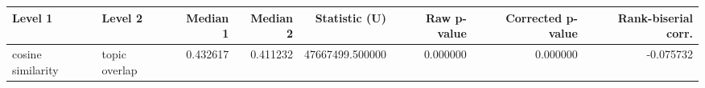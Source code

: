 \begin{tabular}{llrrrrrr}
\toprule
Level 1 & Level 2 & Median 1 & Median 2 & Statistic (U) & Raw p-value & Corrected p-value & Rank-biserial corr. \\
\midrule
cosine similarity & topic overlap & 0.432617 & 0.411232 & 47667499.500000 & 0.000000 & 0.000000 & -0.075732 \\
\bottomrule
\end{tabular}

